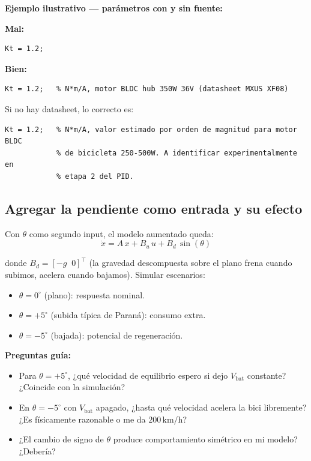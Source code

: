 \documentclass[11pt,a4paper]{article}
\newcommand{\unit}[1]{\,\mathrm{#1}}
\begin{document}
\begin{ejemplo}
\textbf{Ejemplo ilustrativo --- parámetros con y sin fuente:}

\textbf{Mal:}
\begin{lstlisting}[style=matlab]
Kt = 1.2;
\end{lstlisting}

\textbf{Bien:}
\begin{lstlisting}[style=matlab]
Kt = 1.2;   % N*m/A, motor BLDC hub 350W 36V (datasheet MXUS XF08)
\end{lstlisting}

Si no hay datasheet, lo correcto es:
\begin{lstlisting}[style=matlab]
Kt = 1.2;   % N*m/A, valor estimado por orden de magnitud para motor BLDC
            % de bicicleta 250-500W. A identificar experimentalmente en
            % etapa 2 del PID.
\end{lstlisting}
\end{ejemplo}

\subsection{Agregar la pendiente como entrada y su efecto}

Con $\theta$ como segundo input, el modelo aumentado queda:
\begin{equation}
\dot{x} = A\,x + B_u\,u + B_d\,\sin(\theta)
\end{equation}

donde $B_d = [-g\;\;0]^\top$ (la gravedad descompuesta sobre el plano frena cuando subimos, acelera cuando bajamos). Simular escenarios:

\begin{itemize}
    \item $\theta = 0^\circ$ (plano): respuesta nominal.
    \item $\theta = +5^\circ$ (subida típica de Paraná): consumo extra.
    \item $\theta = -5^\circ$ (bajada): potencial de regeneración.
\end{itemize}

\begin{guia}
\textbf{Preguntas guía:}
\begin{itemize}
    \item Para $\theta = +5^\circ$, ¿qué velocidad de equilibrio espero si dejo $V_{\text{bat}}$ constante? ¿Coincide con la simulación?
    \item En $\theta = -5^\circ$ con $V_{\text{bat}}$ apagado, ¿hasta qué velocidad acelera la bici libremente? ¿Es físicamente razonable o me da $200\unit{km/h}$?
    \item ¿El cambio de signo de $\theta$ produce comportamiento simétrico en mi modelo? ¿Debería?
\end{itemize}
\end{guia}
\end{document}
